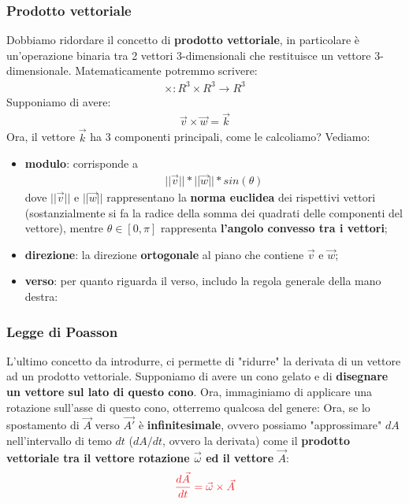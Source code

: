         \subsubsection{Prodotto vettoriale}
            Dobbiamo ridordare il concetto di \textbf{prodotto vettoriale}, in particolare è un'operazione binaria tra 2 vettori 3-dimensionali che restituisce un vettore 3-dimensionale. Matematicamente potremmo scrivere:
            \begin{align*}
                \times: R^3\times R^3\rightarrow R^3
            \end{align*}
            Supponiamo di avere:
            \begin{align*}
                \vec{v}\times\vec{w}=\vec{k}
            \end{align*}
            Ora, il vettore $\vec{k}$ ha 3 componenti principali, come le calcoliamo? Vediamo:
            \begin{itemize}
                \item \textbf{modulo}: corrisponde a
                \begin{align*}
                    ||\vec{v}||*||\vec{w}||*sin(\theta)
                \end{align*}
                dove $||\vec{v}||$ e $||\vec{w}||$ rappresentano la \textbf{norma euclidea} dei rispettivi vettori (sostanzialmente si fa la radice della somma dei quadrati delle componenti del vettore), mentre $\theta\in[0, \pi]$ rappresenta \textbf{l'angolo convesso tra i vettori};
                \item \textbf{direzione}: la direzione \textbf{ortogonale} al piano che contiene $\vec{v}$ e $\vec{w}$;
                \item \textbf{verso}: per quanto riguarda il verso, includo la regola generale della mano destra:
            \end{itemize}

        \subsubsection{Legge di Poasson}
            L'ultimo concetto da introdurre, ci permette di "ridurre" la derivata di un vettore ad un prodotto vettoriale. Supponiamo di avere un cono gelato e di \textbf{disegnare un vettore sul lato di questo cono}. Ora, immaginiamo di applicare una rotazione sull'asse di questo cono, otterremo qualcosa del genere:
            Ora, se lo spostamento di $\vec{A}$ verso $\vec{A'}$ è \textbf{infinitesimale}, ovvero
            possiamo "approssimare" $dA$ nell'intervallo di temo $dt$ ($dA/dt$, ovvero la derivata) come il \textbf{prodotto vettoriale tra il vettore rotazione $\vec{\omega}$ ed il vettore $\vec{A}$}:
            \begin{align*}
                \textcolor{Red}{\frac{d\vec{A}}{dt}=\vec{\omega}\times\vec{A}}
            \end{align*}

